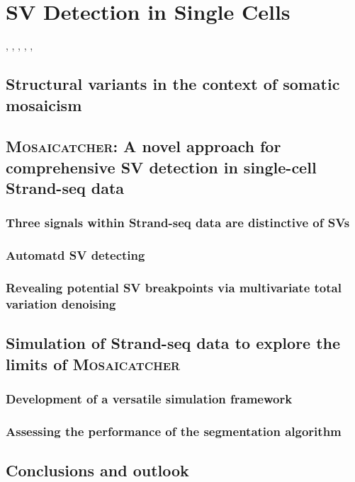 \chapter{SV Detection in Single Cells}
\label{sec:mosaicatcher}

\ashley, \jan, \marschall, \david, \maryam, \venla

\section{Structural variants in the context of somatic mosaicism}
\label{sec:mosaic_mosaicism}



\section{\textsc{Mosaicatcher}: A novel approach for comprehensive SV detection in single-cell Strand-seq data}
\label{sec:mosaic_mc}




\subsection{Three signals within Strand-seq data are distinctive of SVs}
\label{sec:mosaic_concept}



\subsection{Automatd SV detecting}
\label{sec:mosaic_method}



\subsection{Revealing potential SV breakpoints via multivariate total variation denoising}
\label{sec:mosaic_segmentation}


\FloatBarrier
\section{Simulation of Strand-seq data to explore the limits of \textsc{Mosaicatcher}}
\label{sec:mosaic_simul}

\subsection{Development of a versatile simulation framework}

\subsection{Assessing the performance of the segmentation algorithm}

\section{Conclusions and outlook}
\label{sec:mosaic_conclusion}


